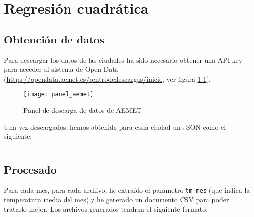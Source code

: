 \chapter{Regresión cuadrática}
\label{appendix:regresion_cuadratica}

\section{Obtención de datos}

Para descargar los datos de las ciudades ha sido necesario obtener una API key para acceder al sistema de Open Data (\url{https://opendata.aemet.es/centrodedescargas/inicio}, ver figura \ref{fig:panel_aemet}).

\begin{figure}[h]
  \caption{Panel de descarga de datos de AEMET}
  \label{fig:panel_aemet}
  \centering
  \texttt{[image: panel\_aemet]}
\end{figure}

Una vez descargados, hemos obtenido para cada ciudad un JSON como el siguiente:

\inputminted{json}{apendices/datos_aemet.json}

\section{Procesado}

Para cada mes, para cada archivo, he extraído el parámetro \verb|tm_mes| (que indica la temperatura media del mes) y he generado un documento CSV para poder tratarlo mejor. Los archivos generados tendrán el siguiente formato:

\inputminted{csv}{apendices/datos_aemet.csv}
